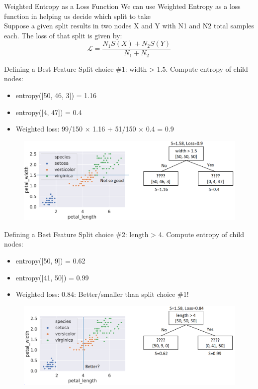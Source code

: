 \documentclass[aspectratio=169]{../latex_main/tntbeamer}  %
\begin{document}
	
	\begin{frame}[c]{Weighted Entropy as a Loss Function}
	    We can use Weighted Entropy as a loss function in helping us decide which split to take\\
	    \bigskip
	    Suppose a given split results in two nodes X and Y with N1 and N2 total samples each. The loss of that split is given by:
	    \begin{equation*}
	        \mathcal{L}=\frac{N_1S(X) + N_2S(Y)}{N_1 + N_2}
	    \end{equation*}
	\end{frame}
	
	\begin{frame}{Defining a Best Feature}
	    Split choice \#1: width > 1.5. Compute entropy of child nodes:
	    \begin{itemize}
	        \item entropy([50, 46, 3]) = 1.16
	        \item entropy([4, 47]) = 0.4
	        \item Weighted loss: 99/150 × 1.16 + 51/150 × 0.4 = 0.9
	    \end{itemize}
	    
	    \begin{figure}
	        \centering
	        \includegraphics[scale=.4]{Bild48}
	    \end{figure}
	\end{frame}
	
	
	\begin{frame}{Defining a Best Feature}
	    Split choice \#2: length > 4. Compute entropy of child nodes:
	    \begin{itemize}
	        \item entropy([50, 9]) = 0.62
	        \item entropy([41, 50]) = 0.99
	        \item Weighted loss: 0.84: Better/smaller than split choice \#1!
	    \end{itemize}
	    
	    \begin{figure}
	        \centering
	        \includegraphics[scale=.4]{Bild49}
	    \end{figure}
	\end{frame}
	
\end{document}

